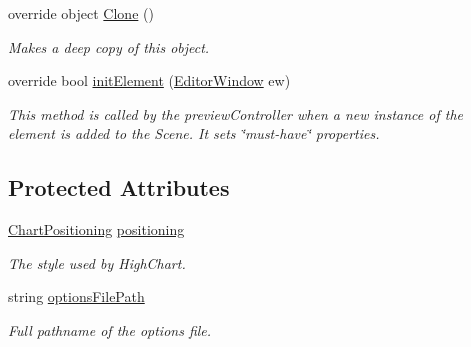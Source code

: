 \begin{DoxyCompactItemize}
override object \hyperlink{class_a_rdev_kit_1_1_model_1_1_project_1_1_chart_aaa06b6e53f2e5a48508f3a93b0483dc3}{Clone} ()
\begin{DoxyCompactList}\small\item\em Makes a deep copy of this object. \end{DoxyCompactList}\item 
override bool \hyperlink{class_a_rdev_kit_1_1_model_1_1_project_1_1_chart_a74620f6abc6763b5999074c5c6e2f661}{init\-Element} (\hyperlink{class_a_rdev_kit_1_1_editor_window}{Editor\-Window} ew)
\begin{DoxyCompactList}\small\item\em This method is called by the preview\-Controller when a new instance of the element is added to the Scene. It sets \char`\"{}must-\/have\char`\"{} properties. \end{DoxyCompactList}\end{DoxyCompactItemize}
\subsection*{Protected Attributes}
\begin{DoxyCompactItemize}
\item 
\hyperlink{class_a_rdev_kit_1_1_model_1_1_project_1_1_chart_positioning}{Chart\-Positioning} \hyperlink{class_a_rdev_kit_1_1_model_1_1_project_1_1_chart_a7b0dcd7f24610f6a7eb747628ee47430}{positioning}
\begin{DoxyCompactList}\small\item\em The style used by High\-Chart. \end{DoxyCompactList}\item 
string \hyperlink{class_a_rdev_kit_1_1_model_1_1_project_1_1_chart_aaf91a6b3628dd8bc5e1717c1fada4f49}{options\-File\-Path}
\begin{DoxyCompactList}\small\item\em Full pathname of the options file. \end{DoxyCompactList}\end{DoxyCompactItemize}

